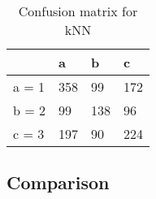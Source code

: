 \documentclass[paper=a4, fontsize=11pt]{scrartcl} %
\numberwithin{equation}{section} %
\numberwithin{figure}{section} %
\numberwithin{table}{section} %
\begin{document}
\begin{table}[h]
\centering
\begin{tabular}{|l|lll|}
	\hline
	      &a   &b   &c \\
	\hline
    a = 1 &358 &99  &172\\
    b = 2 &99  &138 &96 \\
 	c = 3 &197 &90  &224 \\
  \hline
\end{tabular}
\caption{Confusion matrix for kNN}
\end{table}


\subsection{Comparison}



\end{document}
